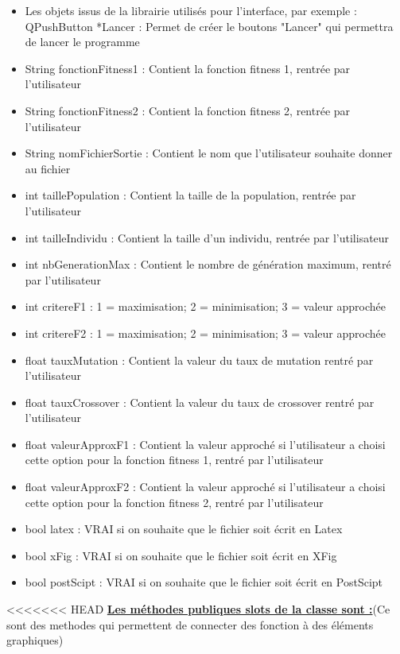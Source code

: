 \documentclass[a4paper,11pt]{article}
\begin{document}
				\begin{itemize}
				\item Les objets issus de la librairie utilisés pour l'interface, par exemple :\\
					QPushButton *Lancer : Permet de créer le boutons "Lancer" qui permettra de lancer le programme\vspace{0.2cm}
				\item String fonctionFitness1 : Contient la fonction fitness 1, rentrée par l'utilisateur
				\item String fonctionFitness2 : Contient la fonction fitness 2, rentrée par l'utilisateur
				\item String nomFichierSortie : Contient le nom que l'utilisateur souhaite donner au fichier
				\item int taillePopulation : Contient la taille de la population, rentrée par l'utilisateur
				\item int tailleIndividu : Contient la taille d'un individu, rentrée par l'utilisateur
				\item int nbGenerationMax : Contient le nombre de génération maximum, rentré par l'utilisateur
				\item int critereF1 : 1  = maximisation; 2 = minimisation; 3 = valeur approchée
				\item int critereF2 : 1  = maximisation; 2 = minimisation; 3 = valeur approchée
				\item float tauxMutation : Contient la valeur du taux de mutation rentré par l'utilisateur
				\item float tauxCrossover : Contient la valeur du taux de crossover rentré par l'utilisateur
				\item float valeurApproxF1 : Contient la valeur approché si l'utilisateur a choisi cette option pour la fonction fitness 1, rentré par l'utilisateur
				\item float valeurApproxF2 : Contient la valeur approché si l'utilisateur a choisi cette option pour la fonction fitness 2, rentré par l'utilisateur
				\item bool latex : VRAI si on souhaite que le fichier soit écrit en Latex
				\item bool xFig : VRAI si on souhaite que le fichier soit écrit en XFig
				\item bool postScipt : VRAI si on souhaite que le fichier soit écrit en PostScipt\\
			\end{itemize}
<<<<<<< HEAD
			\underline{\bf Les méthodes publiques slots de la classe sont :}(Ce sont des methodes qui permettent de connecter des fonction à des éléments graphiques)\\
\end{document}
